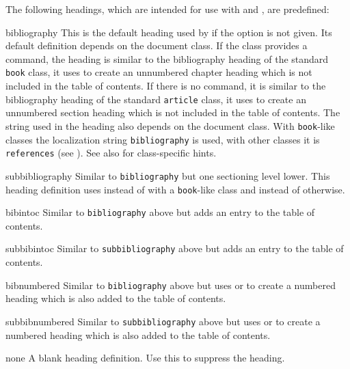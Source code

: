 \documentclass{ltxdockit}[2011/03/25]
\begin{document}
The following headings, which are intended for use with  and , are predefined:

\begin{valuelist*}

\item[bibliography]
This is the default heading used by  if the  option is not given. Its default definition depends on the document class. If the class provides a  command, the heading is similar to the bibliography heading of the standard \latex \texttt{book} class, \ie it uses  to create an unnumbered chapter heading which is not included in the table of contents. If there is no  command, it is similar to the bibliography heading of the standard \latex \texttt{article} class, \ie it uses  to create an unnumbered section heading which is not included in the table of contents. The string used in the heading also depends on the document class. With \texttt{book}-like classes the localization string \texttt{bibliography} is used, with other classes it is \texttt{references} (see ). See also  for class-specific hints.

\item[subbibliography]
Similar to \texttt{bibliography} but one sectioning level lower. This heading definition uses  instead of  with a \texttt{book}-like class and  instead of  otherwise.

\item[bibintoc]
Similar to \texttt{bibliography} above but adds an entry to the table of contents.

\item[subbibintoc]
Similar to \texttt{subbibliography} above but adds an entry to the table of contents.

\item[bibnumbered]
Similar to \texttt{bibliography} above but uses  or  to create a numbered heading which is also added to the table of contents.

\item[subbibnumbered]
Similar to \texttt{subbibliography} above but uses  or  to create a numbered heading which is also added to the table of contents.

\item[none]
A blank heading definition. Use this to suppress the heading.

\end{valuelist*}
\end{document}
